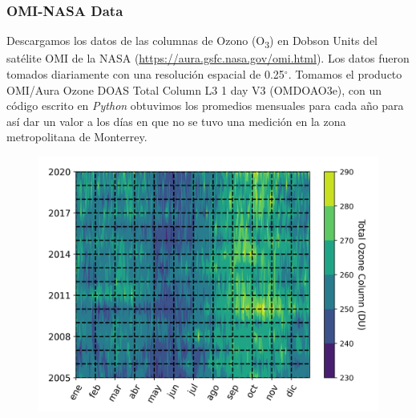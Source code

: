 \subsubsection{OMI-NASA Data}
Descargamos los datos de las columnas de Ozono (O\textsubscript{3}) en Dobson Units del satélite OMI de la NASA 
(\url{https://aura.gsfc.nasa.gov/omi.html}). Los datos fueron tomados diariamente con una resolución espacial de 0.25$^{\circ}$.
Tomamos el producto OMI/Aura Ozone DOAS Total Column L3 1 day V3 (OMDOAO3e), con un código escrito en \textit{Python} obtuvimos
los promedios mensuales para cada año para así dar un valor a los días en que no se tuvo una medición en la zona metropolitana de Monterrey.
\begin{figure}[H]
    \centering
    \includegraphics[scale=0.5]{images/Ozono_Daily.png}
    \caption{}
    \label{fig:ozono_daily}
\end{figure}
